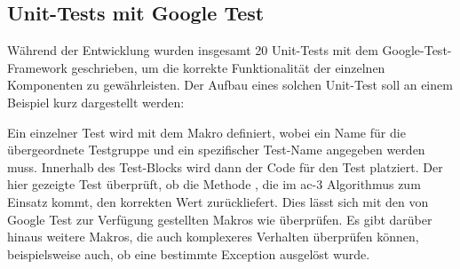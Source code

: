 \subsection{Unit-Tests mit Google Test}
Während der Entwicklung wurden insgesamt 20 Unit-Tests mit dem Google-Test-Framework geschrieben, um die korrekte Funktionalität der einzelnen Komponenten zu gewährleisten.
Der Aufbau eines solchen Unit-Test soll an einem Beispiel kurz dargestellt werden:

Ein einzelner Test wird mit dem Makro  definiert, wobei ein Name für die übergeordnete Testgruppe und ein spezifischer Test-Name angegeben werden muss. Innerhalb des
Test-Blocks wird dann der Code für den Test platziert. Der hier gezeigte Test überprüft, ob die Methode , die im \ac*{ac}-3 Algorithmus zum Einsatz
kommt, den korrekten Wert zurückliefert. Dies lässt sich mit den von Google Test zur Verfügung gestellten Makros wie  überprüfen. Es gibt darüber hinaus
weitere Makros, die auch komplexeres Verhalten überprüfen können, beispielsweise auch, ob eine bestimmte Exception ausgelöst wurde.

